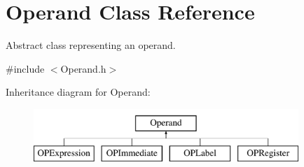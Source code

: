 \hypertarget{classOperand}{\section{\-Operand \-Class \-Reference}
\label{classOperand}
}


\-Abstract class representing an operand.  




{\ttfamily \#include $<$\-Operand.\-h$>$}

\-Inheritance diagram for \-Operand\-:\begin{figure}[H]
\begin{center}
\leavevmode
\includegraphics[height=2.000000cm]{classOperand}
\end{center}
\end{figure}
